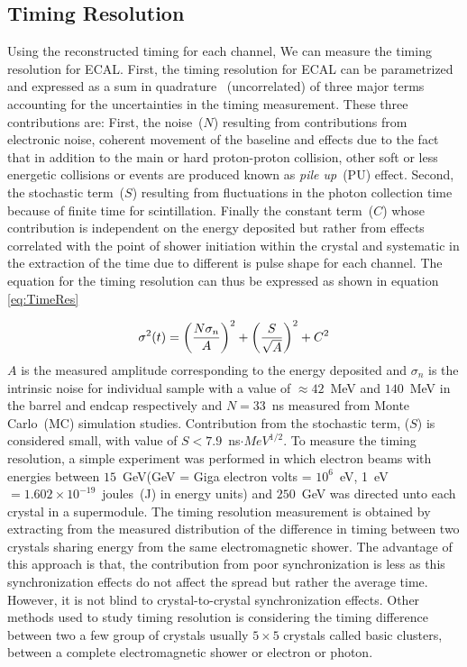 \subsection{Timing Resolution}
Using the reconstructed timing for each channel, We can measure the timing resolution for ECAL.
First, the timing resolution for ECAL can be parametrized and expressed as a sum in quadrature ~(uncorrelated) of three major terms accounting for the uncertainties in the timing measurement. These three contributions are: First, the noise~($N$) resulting from contributions from electronic noise, coherent movement of the baseline and effects due to the fact that in addition to the main or hard proton-proton collision, other soft or less energetic collisions or events are produced known as \textit{pile up}~(PU) effect. Second, the stochastic term~($S$) resulting from fluctuations in the photon collection time because of finite time for \pb scintillation. Finally the constant term~($C$) whose contribution is independent on the energy deposited but rather from effects correlated with the point of shower initiation within the crystal and systematic in the extraction of the time due to different is pulse shape for each channel.
The equation for the timing resolution can thus be expressed as shown in equation \ref{eq:TimeRes}

\begin{equation}{\label{eq:TimeRes}}
\sigma^{2}(t) = \left(\frac{N\sigma_{n}}{A}\right)^{2} + \left(\frac{S}{\sqrt{A}}\right)^{2} + C^{2}
\end{equation}
$A$ is the measured amplitude corresponding to the energy deposited and $\sigma_{n}$ is the intrinsic noise for individual sample with a value of $\approx 42$~MeV and $140$~MeV in the barrel and endcap respectively and $N = 33$~ns measured from Monte Carlo~(MC) simulation studies. Contribution from the stochastic term, ($S$) is considered small, with value of $S < 7.9$~ns$\cdot MeV^{1/2}$.
\newline
To measure the timing resolution, a simple experiment was performed in which electron beams with energies between $15$~GeV(GeV = Giga electron volts = $10^{6}$~eV, 1~eV$ = 1.602 \times 10^{-19}$~joules~(J) in energy units) and $250$~GeV was directed unto each crystal in a supermodule. The timing resolution measurement is obtained by extracting from the measured distribution of the difference in timing between two crystals sharing energy from the same electromagnetic shower. The advantage of this approach is that, the contribution from poor synchronization is less as this synchronization effects do not affect the spread but rather the average time. However, it is not blind to crystal-to-crystal synchronization effects.
Other methods used to study timing resolution is considering the timing difference between two a few group of crystals usually $5\times5$  crystals called basic clusters, between a complete electromagnetic shower or electron or photon.

